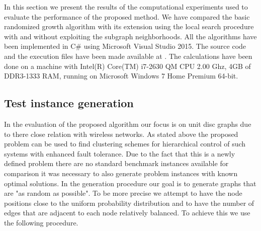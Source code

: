 In this section we present the results of the computational experiments used to evaluate the  performance of the proposed  method. We have compared the basic randomized growth algorithm with its extension using the local search procedure with and without exploiting the subgraph neighborhoods. All the algorithms  have been implemented in C\# using Microsoft Visual Studio 2015. The source code and the execution files have been made available at \citep{Data}. The calculations have been done on a machine with Intel(R) Core(TM) i7-2630 QM CPU \@ 2.00 Ghz, 4GB of DDR3-1333 RAM, running on Microsoft Windows 7 Home Premium 64-bit. 

\subsection{Test instance generation}
In the evaluation of the proposed algorithm our focus is on unit disc graphs due to there close relation with wireless networks. As  stated above the proposed problem can be used to find   clustering schemes for hierarchical control of such systems with enhanced fault tolerance.  
Due to the fact that this is a newly defined problem there are no standard benchmark instances available for comparison it was necessary to also generate  problem instances with known optimal solutions. In the generation procedure our goal is to generate graphs that are "as random as possible". To be more precise we attempt to have the node positions close to the uniform probability distribution and to have the number of edges that are adjacent to each node relatively balanced. To achieve this we use the following procedure. 

